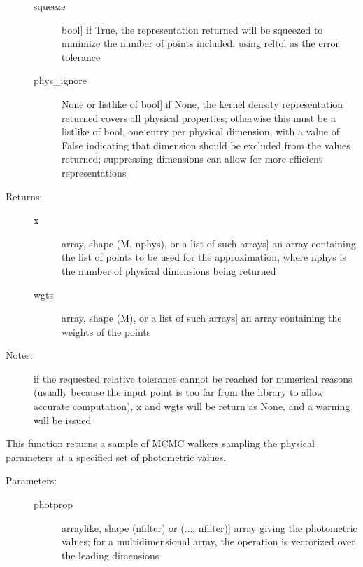 \documentclass[letterpaper,10pt,english]{sphinxmanual}
\begin{document}
\begin{fulllineitems}
\begin{fulllineitems}
\begin{description}
\begin{description}
\item[{squeeze}] \leavevmode{[}bool{]}
if True, the representation returned will be squeezed to
minimize the number of points included, using reltol as
the error tolerance

\item[{phys\_ignore}] \leavevmode{[}None or listlike of bool{]}
if None, the kernel density representation returned
covers all physical properties; otherwise this must be a
listlike of bool, one entry per physical dimension, with
a value of False indicating that dimension should be
excluded from the values returned; suppressing
dimensions can allow for more efficient representations

\end{description}

\item[{Returns:}] \leavevmode\begin{description}
\item[{x}] \leavevmode{[}array, shape (M, nphys), or a list of such arrays{]}
an array containing the list of points to be used for
the approximation, where nphys is the number of
physical dimensions being returned

\item[{wgts}] \leavevmode{[}array, shape (M), or a list of such arrays{]}
an array containing the weights of the points

\end{description}

\item[{Notes:}] \leavevmode
if the requested relative tolerance cannot be reached for
numerical reasons (usually because the input point is too
far from the library to allow accurate computation), x and
wgts will be return as None, and a warning will be issued

\end{description}

\end{fulllineitems}


\begin{fulllineitems}
\label{bayesphot:slugpy.bayesphot.bp.bp.mcmc}
This function returns a sample of MCMC walkers sampling the
physical parameters at a specified set of photometric values.
\begin{description}
\item[{Parameters:}] \leavevmode\begin{description}
\item[{photprop}] \leavevmode{[}arraylike, shape (nfilter) or (..., nfilter){]}
array giving the photometric values; for a
multidimensional array, the operation is vectorized over
the leading dimensions


\end{description}
\end{description}
\end{fulllineitems}
\end{fulllineitems}
\end{document}
